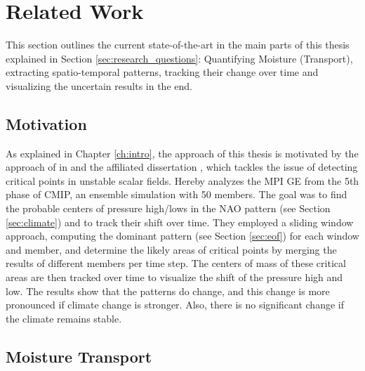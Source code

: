 \chapter{Related Work}
\label{ch:related_work}

This section outlines the current state-of-the-art in the main parts of this thesis explained in Section \ref{sec:research_questions}: Quantifying Moisture (Transport), extracting spatio-temporal patterns, tracking their change over time and visualizing the uncertain results in the end.

\section{Motivation}

As explained in Chapter \ref{ch:intro}, the approach of this thesis is motivated by the approach of \citeauthor{vietinghoff_visual_2021} in \cite{vietinghoff_visual_2021} and the affiliated dissertation \cite{vietinghoffdiss}, which tackles the issue of detecting critical points in unstable scalar fields.
Hereby \cite{vietinghoff_visual_2021} analyzes the MPI GE \cite{maher_max_2019} from the 5th phase of CMIP, an ensemble simulation with 50 members. 
The goal was to find the probable centers of pressure high/lows in the NAO pattern (see Section \ref{sec:climate}) and to track their shift over time. 
They employed a sliding window approach, computing the dominant pattern (see Section \ref{sec:eof})  for each window and member, and determine the likely areas of critical points by merging the results of different members per time step. 
The centers of mass of these critical areas are then tracked over time to visualize the shift of the pressure high and low. 
The results show that the patterns do change, and this change is more pronounced if climate change is stronger. 
Also, there is no significant change if the climate remains stable.


\section{Moisture Transport}
\label{sec:moisture-transport}


